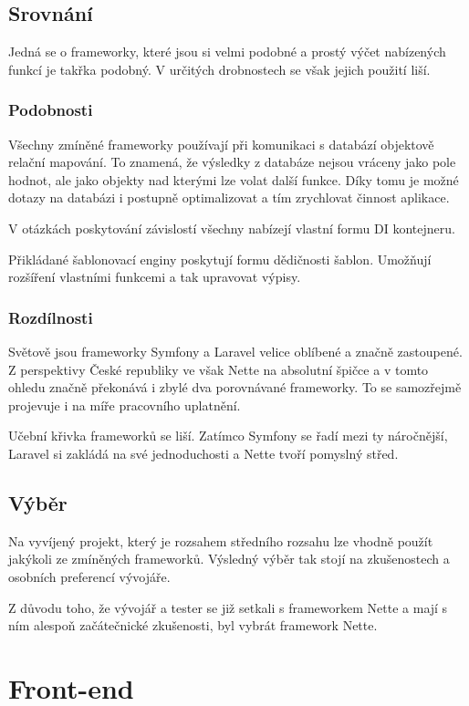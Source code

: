 \documentclass[czech,BP]{thesiskiv}
\begin{document}
	\subsection{Srovnání}
	\par Jedná se o frameworky, které jsou si velmi podobné a prostý výčet nabízených funkcí je takřka podobný. V určitých drobnostech se však jejich použití liší.
	\subsubsection{Podobnosti}
	\par Všechny zmíněné frameworky používají při komunikaci s databází objektově relační mapování. To znamená, že výsledky z databáze nejsou vráceny jako pole hodnot, ale jako objekty nad kterými lze volat další funkce. Díky tomu je možné dotazy na databázi i postupně optimalizovat a tím zrychlovat činnost aplikace.
	\par V otázkách poskytování závislostí všechny nabízejí vlastní formu DI kontejneru.
	\par Přikládané šablonovací enginy poskytují formu dědičnosti šablon. Umožňují rozšíření vlastními funkcemi a tak upravovat výpisy.
	\subsubsection{Rozdílnosti}
	\par Světově jsou frameworky Symfony a Laravel velice oblíbené a značně zastoupené. Z perspektivy České republiky ve však Nette na absolutní špičce a v tomto ohledu značně překonává i zbylé dva porovnávané frameworky. To se samozřejmě projevuje i na míře pracovního uplatnění.
	\par Učební křivka frameworků se liší. Zatímco Symfony se řadí mezi ty náročnější, Laravel si zakládá na své jednoduchosti a Nette tvoří pomyslný střed.
	\subsection{Výběr}
	\par Na vyvíjený projekt, který je rozsahem středního rozsahu lze vhodně použít jakýkoli ze zmíněných frameworků. Výsledný výběr tak stojí na zkušenostech a osobních preferencí vývojáře.
	\par Z důvodu toho, že vývojář a tester se již setkali s frameworkem Nette a mají s ním alespoň začátečnické zkušenosti, byl vybrát framework Nette.
\section{Front-end}
\end{document}

